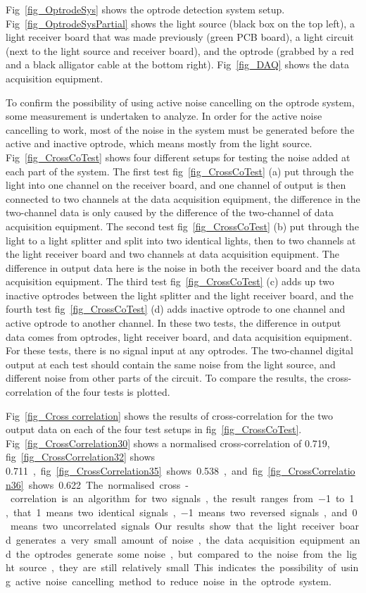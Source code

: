 Fig~\ref{fig_OptrodeSys} shows the optrode detection system setup.  Fig~\ref{fig_OptrodeSysPartial} shows the light source (black box on the top left), a light receiver board that was made previously (green PCB board), a light circuit (next to the light source and receiver board), and the optrode (grabbed by a red and a black alligator cable at the bottom right).  Fig~\ref{fig_DAQ} shows the data acquisition equipment.

To confirm the possibility of using active noise cancelling on the optrode system, some measurement is undertaken to analyze.  In order for the active noise cancelling to work, most of the noise in the system must be generated before the active and inactive optrode, which means mostly from the light source.  Fig~\ref{fig_CrossCoTest} shows four different setups for testing the noise added at each part of the system.  The first test fig~\ref{fig_CrossCoTest} (a) put through the light into one channel on the receiver board, and one channel of output is then connected to two channels at the data acquisition equipment, the difference in the two-channel data is only caused by the difference of the two-channel of data acquisition equipment.  The second test fig~\ref{fig_CrossCoTest} (b) put through the light to a light splitter and split into two identical lights, then to two channels at the light receiver board and two channels at data acquisition equipment.  The difference in output data here is the noise in both the receiver board and the data acquisition equipment.  The third test fig~\ref{fig_CrossCoTest} (c) adds up two inactive optrodes between the light splitter and the light receiver board, and the fourth test fig~\ref{fig_CrossCoTest} (d) adds inactive optrode to one channel and active optrode to another channel.  In these two tests, the difference in output data comes from optrodes, light receiver board, and data acquisition equipment.  For these tests, there is no signal input at any optrodes.  The two-channel digital output at each test should contain the same noise from the light source, and different noise from other parts of the circuit.  To compare the results, the cross-correlation of the four tests is plotted.

Fig~\ref{fig_Cross correlation} shows the results of cross-correlation for the two output data on each of the four test setups in fig~\ref{fig_CrossCoTest}.  Fig~\ref{fig_CrossCorrelation30} shows a normalised cross-correlation of \qty{0.719}{}, fig~\ref{fig_CrossCorrelation32} shows \qty{0.711}, fig~\ref{fig_CrossCorrelation35} shows \qty{0.538}, and fig~\ref{fig_CrossCorrelation36} shows \qty{0.622}.  The normalised cross-correlation is an algorithm for two signals, the result ranges from \qty{-1}{} to \qty{1}{}, that \qty{1}{} means two identical signals, \qty{-1}{} means two reversed signals, and \qty{0}{} means two uncorrelated signals.  Our results show that the light receiver board generates a very small amount of noise, the data acquisition equipment and the optrodes generate some noise, but compared to the noise from the light source, they are still relatively small.  This indicates the possibility of using active noise cancelling method to reduce noise in the optrode system.

